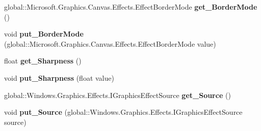 \begin{DoxyCompactItemize}
\item 
\mbox{\label{interface_microsoft_1_1_graphics_1_1_canvas_1_1_effects_1_1_i_scale_effect_ac46828996e589095068e0beff4165185}} 
global\+::\+Microsoft.\+Graphics.\+Canvas.\+Effects.\+Effect\+Border\+Mode {\bfseries get\+\_\+\+Border\+Mode} ()
\item 
\mbox{\label{interface_microsoft_1_1_graphics_1_1_canvas_1_1_effects_1_1_i_scale_effect_a56c46fac62fdf0f627612c3363b495f4}} 
void {\bfseries put\+\_\+\+Border\+Mode} (global\+::\+Microsoft.\+Graphics.\+Canvas.\+Effects.\+Effect\+Border\+Mode value)
\item 
\mbox{\label{interface_microsoft_1_1_graphics_1_1_canvas_1_1_effects_1_1_i_scale_effect_a76ce1ef01a06978e684a4618f550223f}} 
float {\bfseries get\+\_\+\+Sharpness} ()
\item 
\mbox{\label{interface_microsoft_1_1_graphics_1_1_canvas_1_1_effects_1_1_i_scale_effect_afab0f505adbbffee701a263c3e62fe43}} 
void {\bfseries put\+\_\+\+Sharpness} (float value)
\item 
\mbox{\label{interface_microsoft_1_1_graphics_1_1_canvas_1_1_effects_1_1_i_scale_effect_a5d893ef5b6101520f8cfba14fe6da905}} 
global\+::\+Windows.\+Graphics.\+Effects.\+I\+Graphics\+Effect\+Source {\bfseries get\+\_\+\+Source} ()
\item 
\mbox{\label{interface_microsoft_1_1_graphics_1_1_canvas_1_1_effects_1_1_i_scale_effect_ad103c9b390384b145ae6c1e98f30522e}} 
void {\bfseries put\+\_\+\+Source} (global\+::\+Windows.\+Graphics.\+Effects.\+I\+Graphics\+Effect\+Source source)
\item 
\mbox{\label{interface_microsoft_1_1_graphics_1_1_canvas_1_1_effects_1_1_i_scale_effect_afae9f41434e94bb89958e555bf403b47}} 

\end{DoxyCompactItemize}
